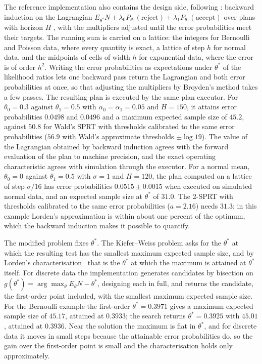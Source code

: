 \documentclass[11pt,a4paper]{article}
\theoremstyle{definition}
\theoremstyle{remark}
\begin{document}
The reference implementation also contains the design side, following
\cite{novikov2022a,novikov2022b,novikov2023}: backward induction
on the Lagrangian $E_{\theta^*}N+\lambda_0P_{\theta_0}(\text{reject})+
\lambda_1P_{\theta_1}(\text{accept})$ over plans with horizon $H$
\cite{lorden1980}, with the multipliers adjusted until the error
probabilities meet their targets. The running sum is carried on a
lattice: the integers for Bernoulli and Poisson data, where every
quantity is exact, a lattice of step $h$ for normal data, and the
midpoints of cells of width $h$ for exponential data, where the error is
of order $h^2$. Writing the error probabilities as expectations
under $\theta^*$ of the likelihood ratios lets one backward pass return
the Lagrangian and both error probabilities at once, so that adjusting
the multipliers by Broyden's method takes a few passes. The resulting
plan is executed by the same plan executor. For $\theta_0=0.3$ against
$\theta_1=0.5$ with $\alpha_0=\alpha_1=0.05$ and $H=150$, it attains
error probabilities $0.0498$ and $0.0496$ and a maximum expected sample
size of $45.2$, against $50.8$ for Wald's SPRT with thresholds
calibrated to the same error probabilities ($56.9$ with Wald's
approximate thresholds $\pm\log 19$). The value of the Lagrangian obtained by backward
induction agrees with the forward evaluation of the plan to machine
precision, and the exact operating characteristic agrees with
simulation through the executor. For a normal mean, $\theta_0=0$ against
$\theta_1=0.5$ with $\sigma=1$ and $H=120$, the plan computed on a lattice of step
$\sigma/16$ has error probabilities $0.0515\pm0.0015$ when executed on
simulated normal data, and an expected sample size at $\theta^*$ of
$31.0$. The 2-SPRT with thresholds calibrated to the same error
probabilities ($a=2.16$) needs $31.3$: in this example Lorden's
approximation is within about one percent of the optimum, which the
backward induction makes it possible to quantify.

The modified problem fixes $\theta^*$. The Kiefer--Weiss problem asks
for the $\theta^*$ at which the resulting test has the smallest maximum
expected sample size, and by Lorden's characterisation~\cite{lorden1980}
that is the $\theta^*$ at which the maximum is attained at $\theta^*$
itself. For discrete data the implementation generates candidates by
bisection on $g(\theta^*)=\arg\max_\theta E_\theta N-\theta^*$, designing
each in full, and returns the candidate, the first-order point included,
with the smallest maximum expected sample size. For the Bernoulli example the first-order
$\theta^*=0.3971$ gives a maximum expected sample size of $45.17$,
attained at $0.3933$; the search returns $\theta^*=0.3925$ with $45.01$,
attained at $0.3936$. Near the solution the maximum is flat in
$\theta^*$, and for discrete data it moves in small steps because the
attainable error probabilities do, so the gain over the first-order
point is small and the characterisation holds only approximately.
\end{document}
